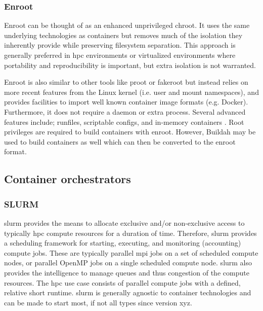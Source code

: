 \documentclass[conference]{IEEEtran}
\begin{document}
\subsubsection{Enroot}
Enroot can be thought of as an enhanced unprivileged chroot. It uses the same underlying technologies as containers but removes much of the isolation they inherently provide while preserving filesystem separation. This approach is generally preferred in \gls{hpc} environments or virtualized environments where portability and reproducibility is important, but extra isolation is not warranted.

Enroot is also similar to other tools like proot or fakeroot but instead relies on more recent features from the Linux kernel (i.e. user and mount namespaces), and provides facilities to import well known container image formats (e.g. Docker). Furthermore, it does not require a daemon or extra process. Several advanced features include; runfiles, scriptable configs, and in-memory containers \cite{nvidia-slurm-containers}. Root privileges are required to build containers with enroot. However, Buildah may be used to build containers as well which can then be converted to the enroot format.


\subsection{Container orchestrators}
\subsubsection{SLURM}
\gls{slurm} provides the means to allocate exclusive and/or non-exclusive access to typically \gls{hpc} compute resources for a duration of time. Therefore, \gls{slurm} provides a scheduling framework for starting, executing, and monitoring (accounting) compute jobs. These are typically parallel \gls{mpi} jobs on a set of scheduled compute nodes, or parallel OpenMP jobs on a single scheduled compute node. \gls{slurm} also provides the intelligence to manage queues and thus congestion of the compute resources. The \gls{hpc} use case consists of parallel compute jobs with a defined, relative short runtime. \gls{slurm} is generally agnostic to container technologies and can be made to start most, if not all types since version xyz.
\end{document}
